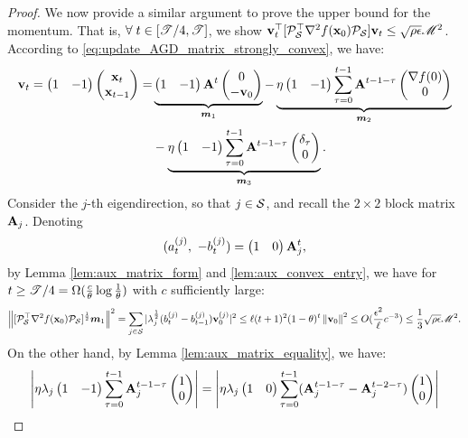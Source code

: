 \begin{proof}



We now provide a similar argument to prove the upper bound for the momentum. 
That is, $\forall \; t\in [\utime/4, \utime]$, we show
$\v_t\trans [\proj_\S\trans \hess f(\x_0) \proj_\S] \v_t \le \sqrt{\rho\epsilon}\umom^2$. According to \eqref{eq:update_AGD_matrix_strongly_convex}, 
we have:
\begin{align*}
\v_t = \pmat{1 & -1}\pmat{\x_{t} \\ \x_{t-1}}
=& \underbrace{\pmat{1 & -1}\A^{t}\pmat{0 \\ -\v_0} }_{\m_1}
-\underbrace{\eta\pmat{1 & -1}\sum_{\tau = 0}^{t-1} \A^{t-1-\tau}\pmat{\grad f(0)  \\ 0}}_{\m_2} \\
&- \underbrace{\eta\pmat{1 & -1}\sum_{\tau = 0}^{t-1} \A^{t-1-\tau}\pmat{\delta_{\tau} \\ 0}}_{\m_3}.
\end{align*}
Consider the $j$-th eigendirection, so that $j \in \S$, and recall the $2\times 2$ block matrix $\A_j$. Denoting
\begin{equation*}
(a^{(j)}_{t}, ~-b^{(j)}_t) =\pmat{1 & 0 }\A_j^{t},
\end{equation*}
by Lemma \ref{lem:aux_matrix_form} and \ref{lem:aux_convex_entry}, we have for $t\ge \utime/4 = \Omega(\frac{c}{\theta}\log\frac{1}{\theta})$ with $c$ sufficiently large:
\begin{equation*}
\norm{[\proj_\S\trans \hess f(\x_0) \proj_\S]^{\frac{1}{2}}\m_1}^2 = \sum_{j \in \S} |\lambda_j^{\frac{1}{2}} (b^{(j)}_t -b^{(j)}_{t-1})  \v_0^{(j)}|^2
\le \ell(t+1)^2 (1-\theta)^t \norm{\v_0}^2 \le O(\frac{\epsilon^2}{\ell}c^{-3}) \le \frac{1}{3}\sqrt{\rho\epsilon}\umom^2.
\end{equation*}
On the other hand, by Lemma \ref{lem:aux_matrix_equality}, we have:
\begin{align*}
\abs{\eta \lambda_j \pmat{1 & -1}\sum_{\tau = 0}^{t-1} \A_j^{t-1-\tau}\pmat{1 \\0}}
= \abs{\eta \lambda_j \pmat{1 & 0}\sum_{\tau = 0}^{t-1} (\A_j^{t-1-\tau}- \A_j^{t-2-\tau})\pmat{1 \\0}}

\end{align*}
\end{proof}
